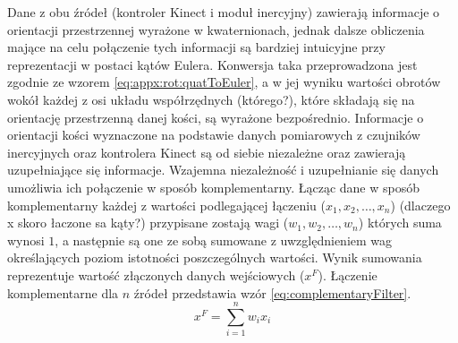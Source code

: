 Dane z obu źródeł (kontroler Kinect i moduł inercyjny) zawierają informacje o orientacji przestrzennej wyrażone w kwaternionach, jednak dalsze obliczenia mające na celu połączenie tych informacji są bardziej intuicyjne przy reprezentacji w postaci kątów Eulera. Konwersja taka przeprowadzona jest zgodnie ze wzorem \eqref{eq:appx:rot:quatToEuler}, a w jej wyniku wartości obrotów wokół każdej z osi układu współrzędnych (którego?), które składają się na orientację przestrzenną danej kości, są wyrażone bezpośrednio. Informacje o orientacji kości wyznaczone na podstawie danych pomiarowych z czujników inercyjnych oraz kontrolera Kinect są od siebie niezależne oraz zawierają uzupełniające się informacje. Wzajemna niezależność i uzupełnianie się danych umożliwia ich połączenie w sposób komplementarny. Łącząc dane w sposób komplementarny każdej z wartości podlegającej łączeniu ($x_1, x_2,\ldots, x_n$) (dlaczego x skoro łaczone sa kąty?) przypisane zostają wagi ($w_1,w_2,\ldots,w_n$) których suma wynosi $1$, a następnie są one ze sobą sumowane z uwzględnieniem wag określających poziom istotności poszczególnych wartości. Wynik sumowania reprezentuje wartość złączonych danych wejściowych ($x^F$). Łączenie komplementarne dla $n$ źródeł przedstawia wzór \eqref{eq:complementaryFilter}.
\begin{equation}
	x^F = \sum_{i=1}^{n}{w_i x_i}
	\label{eq:complementaryFilter}
\end{equation}

